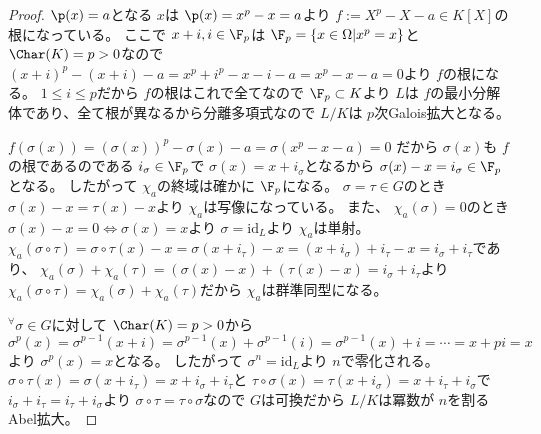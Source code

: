 \documentclass[../master_galois_theory]{subfiles}
\begin{document}
\begin{proof}
  $\p(x) = a$となる $x$は $\p(x) = x^p - x = a$より $ f := X^p - X - a \in K[X]$の根になっている。
  ここで $x + i , i \in \F_p$は $\F_p = \{ x \in \Omega | x^p = x \}$と
  $\Char(K) = p > 0$なので
  $(x + i)^p - (x + i) - a = x^p + i^p - x - i - a = x^p - x - a = 0$より
  $f$の根になる。
  $1 \leq i \leq p$だから $f$の根はこれで全てなので $\F_p \subset K$より
  $L$は $f$の最小分解体であり、全て根が異なるから分離多項式なので
  $L/K$は $p$次\rm{Galois}拡大となる。

  $f(\sigma(x)) = (\sigma(x))^p - \sigma(x) - a = \sigma(x^p - x - a) = 0$
  だから $\sigma(x)$も $f$の根であるのである $i_\sigma \in \F_p$で
  $\sigma(x) = x + i_\sigma$となるから $\sigma(x) - x = i_\sigma \in \F_p$となる。
  したがって $\chi_a$の終域は確かに $\F_p$になる。
  $\sigma = \tau \in G$のとき $\sigma(x) - x = \tau(x) - x$より
  $\chi_a$は写像になっている。
  また、 $\chi_a(\sigma) = 0$のとき $\sigma(x) - x = 0 \Leftrightarrow \sigma(x) = x$より $\sigma = \mathrm{id}_L$より $\chi_a$は単射。
  $\chi_a(\sigma \circ \tau) = \sigma \circ \tau(x) - x = \sigma(x + i_\tau) - x = (x + i_\sigma) + i_\tau - x = i_\sigma + i_\tau$であり、
  $\chi_a(\sigma) + \chi_a(\tau) = (\sigma(x) - x) + (\tau(x) - x) = i_\sigma + i_\tau$より $\chi_a(\sigma \circ \tau) = \chi_a(\sigma) + \chi_a(\tau)$だから $\chi_a$は群準同型になる。

  ${}^\forall \sigma \in G$に対して $\Char(K) = p > 0$から
  $\sigma^p(x) = \sigma^{p-1}(x + i) = \sigma^{p-1}(x) + \sigma^{p-1}(i) = \sigma^{p-1}(x) + i = \cdots = x + pi = x$より $\sigma^p(x) = x$となる。
  したがって $\sigma^n = \mathrm{id}_L$より $n$で零化される。
  $\sigma \circ \tau(x) = \sigma(x + i_\tau) = x + i_\sigma + i_\tau$と
  $\tau \circ \sigma(x) = \tau(x + i_\sigma) = x + i_\tau + i_\sigma$で
  $i_\sigma + i_\tau = i_\tau + i_\sigma$より $\sigma \circ \tau = \tau \circ \sigma$なので $G$は可換だから $L/K$は冪数が $n$を割る\rm{Abel}拡大。
\end{proof}
\end{document}
